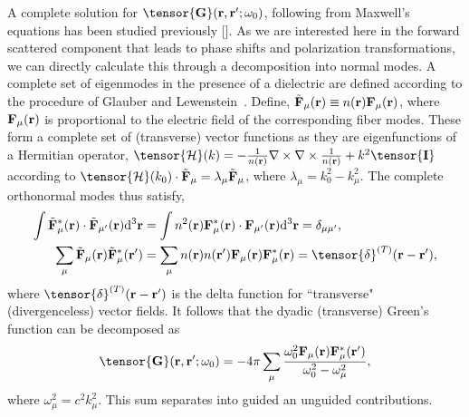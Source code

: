 \documentclass[preprint,aps,pra,onecolumn]{revtex4-1} %
\begin{document}
A complete solution for $\tensor{\mathbf{G}}(\br ,\br' ; \omega_0)$, following from Maxwell's equations has been studied previously [].  As we are interested here in the forward scattered component that leads to phase shifts and polarization transformations, we can directly calculate this through a decomposition into normal modes.  A complete set of eigenmodes in the presence of a dielectric are defined according to the procedure of Glauber and Lewenstein~\cite{Glauber1991}.  Define, $\tilde{\mathbf{F}}_\mu(\mathbf{r}) \equiv n(\mathbf{r}) \mathbf{F}_\mu (\mathbf{r})$, where $\mathbf{F}_\mu (\mathbf{r})$ is proportional to the electric field of the corresponding fiber modes.  These form a complete set of (transverse) vector functions as they are eigenfunctions of a Hermitian operator, $\tensor{\mathcal{H}}(k) = -\frac{1}{n(\br)}
\nabla\times\nabla\times \frac{1}{n(\br)} + k^2 \tensor{\mathbf{I}}$ according to $\tensor{\mathcal{H}}(k_0) \cdot \tilde{\mathbf{F}}_\mu = \lambda_\mu \tilde{\mathbf{F}}_\mu$, where $\lambda_\mu=k_0^2-k_\mu^2$.
The complete orthonormal modes thus satisfy,
\begin{align}
\int \tilde{\mathbf{F}}_\mu^* (\br)\cdot \tilde{\mathbf{F}}_{\mu'}(\br) \mathrm{d}^3\br &= \int n^2(\br) \mathbf{F}_\mu^* (\br)\cdot  \mathbf{F}_{\mu'}(\br) \mathrm{d}^3\br=\delta_{\mu\mu'},\label{eq:orthutrans}
\\
\sum_\mu \tilde{\mathbf{F}}_\mu (\br) \tilde{\mathbf{F}}_\mu^*(\br') &= \sum_\mu n(\br)n(\br') \mathbf{F}_\mu  (\br) \mathbf{F}_\mu^*(\br) =\tensor{\delta}^{(T)}(\br-\br'), 
\end{align}
where $\tensor{\delta}^{(T)}(\br-\br')$ is the  delta function for ``transverse" (divergenceless) vector fields.  It follows that the dyadic (transverse) Green's function can be decomposed as~\cite{Swedishguys}
\begin{equation}
\tensor{\mathbf{G}}(\br,\br'; \omega_0) = -4\pi \sum_{\mu} \frac{\omega_0^2\mathbf{F}_\mu (\br) \mathbf{F}^*_\mu (\br')}{\omega_0^2-\omega_\mu^2},
\end{equation}
where $\omega_\mu^2 = c^2 k_\mu^2$.  This sum separates into guided an unguided contributions. 
\end{document}
